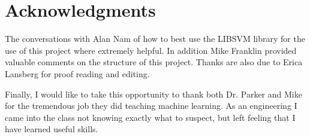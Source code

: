 \section*{Acknowledgments}
The conversations with Alan Nam of how to best use the LIBSVM library for the use of this project where extremely helpful.
In addition Mike Franklin provided valuable comments on the structure of this project.
Thanks are also due to Erica Lansberg for proof reading and editing.

Finally, I would like to take this opportunity to thank both Dr. Parker and Mike for the tremendous job they did teaching machine learning.  As an engineering I came into the class not knowing exactly what to suspect, but left feeling that I have learned useful skills.


